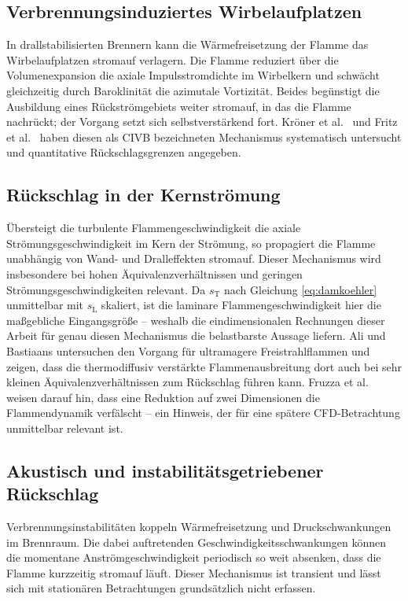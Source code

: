 \subsection{Verbrennungsinduziertes Wirbelaufplatzen}\label{subsec:civb}

In drallstabilisierten Brennern kann die Wärmefreisetzung der Flamme das
Wirbelaufplatzen stromauf verlagern. Die Flamme reduziert über die
Volumenexpansion die axiale Impulsstromdichte im Wirbelkern und schwächt
gleichzeitig durch Baroklinität die azimutale Vortizität. Beides begünstigt
die Ausbildung eines Rückströmgebiets weiter stromauf, in das die Flamme
nachrückt; der Vorgang setzt sich selbstverstärkend fort. Kröner et al.\
\cite{Kroner_2003} und Fritz et al.\ \cite{Fritz_2004} haben diesen als CIVB
bezeichneten Mechanismus systematisch untersucht und quantitative
Rückschlagsgrenzen angegeben.

\subsection{Rückschlag in der Kernströmung}\label{subsec:core}

Übersteigt die turbulente Flammengeschwindigkeit die axiale
Strömungsgeschwindigkeit im Kern der Strömung, so propagiert die Flamme
unabhängig von Wand- und Dralleffekten stromauf. Dieser Mechanismus wird
insbesondere bei hohen Äquivalenzverhältnissen und geringen
Strömungsgeschwindigkeiten relevant. Da $s_\mathrm{T}$ nach
Gleichung \eqref{eq:damkoehler} unmittelbar mit $s_\mathrm{L}$ skaliert, ist
die laminare Flammengeschwindigkeit hier die maßgebliche Eingangsgröße --
weshalb die eindimensionalen Rechnungen dieser Arbeit für genau diesen
Mechanismus die belastbarste Aussage liefern. Ali und Bastiaans
\cite{Ali_2026} untersuchen den Vorgang für ultramagere Freistrahlflammen und
zeigen, dass die thermodiffusiv verstärkte Flammenausbreitung dort auch bei
sehr kleinen Äquivalenzverhältnissen zum Rückschlag führen kann. Fruzza et al.\
\cite{Fruzza_2025} weisen darauf hin, dass eine Reduktion auf zwei Dimensionen
die Flammendynamik verfälscht -- ein Hinweis, der für eine spätere
CFD-Betrachtung unmittelbar relevant ist.

\subsection{Akustisch und instabilitätsgetriebener Rückschlag}\label{subsec:acoustic}

Verbrennungsinstabilitäten koppeln Wärmefreisetzung und Druckschwankungen im
Brennraum. Die dabei auftretenden Geschwindigkeitsschwankungen können die
momentane Anströmgeschwindigkeit periodisch so weit absenken, dass die Flamme
kurzzeitig stromauf läuft. Dieser Mechanismus ist transient und lässt sich mit
stationären Betrachtungen grundsätzlich nicht erfassen.

